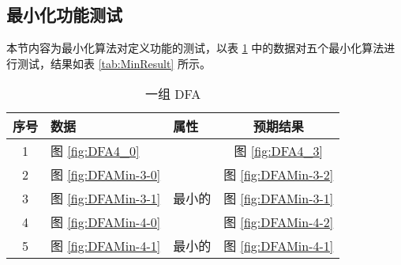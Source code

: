 \subsection{最小化功能测试}

本节内容为最小化算法对定义功能的测试，以表 \ref{tab:MinData} 中的数据对五个最小化算法进行测试，结果如表 \ref{tab:MinResult} 所示。

\begin{table}[!htbp]
    \caption{一组 DFA}
    \label{tab:MinData}
    \centering
    \small%
    \setlength{\tabcolsep}{4pt}%
    \renewcommand{\arraystretch}{1.2}%
    \begin{tabular}{c p{4em}<{\centering} p{4em}<{\centering} c }  %
        \toprule %
                序号  &  数据 & 属性 & 预期结果  \\
        \midrule%
        1 &  图 \ref{fig:DFA4_0} &            & 图 \ref{fig:DFA4_3}\\
        \midrule
        2 & 图 \ref{fig:DFAMin-3-0} &         & 图 \ref{fig:DFAMin-3-2}  \\
        3 & 图 \ref{fig:DFAMin-3-1} & 最小的  & 图 \ref{fig:DFAMin-3-1}  \\
        \midrule
        4 & 图 \ref{fig:DFAMin-4-0} &        & 图 \ref{fig:DFAMin-4-2}  \\
        5 & 图 \ref{fig:DFAMin-4-1} & 最小的  & 图 \ref{fig:DFAMin-4-1}  \\
        \bottomrule%
    \end{tabular}
\end{table}

